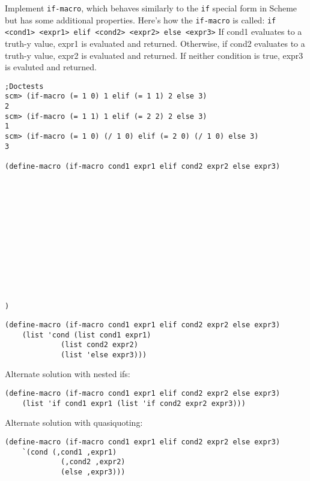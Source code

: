 \begin{blocksection}

\question Implement \texttt{if-macro}, which behaves similarly to the \texttt{if} special form in Scheme
but has some additional properties. Here's how the \texttt{if-macro} is called:
\newline
\texttt{if <cond1> <expr1> elif <cond2> <expr2> else <expr3>}
\newline
If cond1 evaluates to a truth-y value, expr1 is evaluated and returned. Otherwise, if cond2 evaluates
to a truth-y value, expr2 is evaluated and returned. If neither condition is true, expr3 is evaluted and returned.

\begin{lstlisting}
;Doctests
scm> (if-macro (= 1 0) 1 elif (= 1 1) 2 else 3)
2
scm> (if-macro (= 1 1) 1 elif (= 2 2) 2 else 3)
1
scm> (if-macro (= 1 0) (/ 1 0) elif (= 2 0) (/ 1 0) else 3)
3

(define-macro (if-macro cond1 expr1 elif cond2 expr2 else expr3)













)
\end{lstlisting}
\end{blocksection}
\begin{blocksection}
\begin{solution}[0.5in]
\begin{lstlisting}
(define-macro (if-macro cond1 expr1 elif cond2 expr2 else expr3)
    (list 'cond (list cond1 expr1)
             (list cond2 expr2)
             (list 'else expr3)))
\end{lstlisting}
Alternate solution with nested ifs:
\begin{lstlisting}
(define-macro (if-macro cond1 expr1 elif cond2 expr2 else expr3)
    (list 'if cond1 expr1 (list 'if cond2 expr2 expr3)))
\end{lstlisting}
Alternate solution with quasiquoting:
\begin{lstlisting}
(define-macro (if-macro cond1 expr1 elif cond2 expr2 else expr3)
    `(cond (,cond1 ,expr1)
             (,cond2 ,expr2)
             (else ,expr3)))
\end{lstlisting}
\end{solution}

\end{blocksection}

